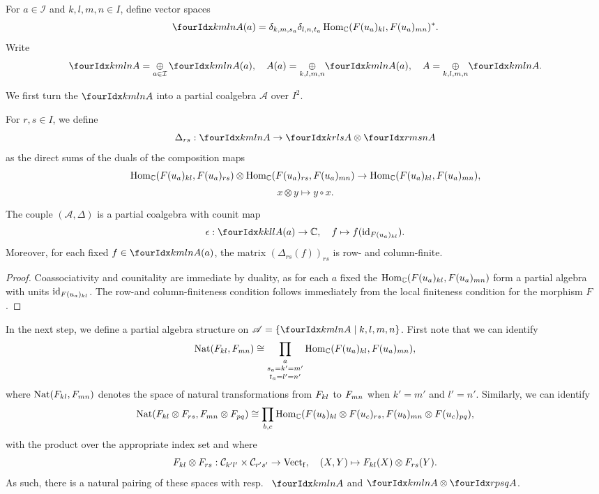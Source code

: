 \begin{Def} For $a\in \mathcal{I}$ and $k,l,m,n\in I$, define vector spaces \[\Gr{A}{k}{l}{m}{n}(a) =  \delta_{k,m,s_a}\delta_{l,n,t_a} \Hom_{\C}(\Forget(u_a)_{kl},\Forget(u_a)_{mn})^*.\] Write \[\Gr{A}{k}{l}{m}{n} =\underset{a\in \mathcal{I}}{\oplus}\, \Gr{A}{k}{l}{m}{n}(a),\quad A(a) = \underset{k,l,m,n}{\oplus} \Gr{A}{k}{l}{m}{n}(a),\quad A = \underset{k,l,m,n}{\oplus} \Gr{A}{k}{l}{m}{n}.\] 
\end{Def} 


We first turn the $\Gr{A}{k}{l}{m}{n}$ into a partial coalgebra $\mathscr{A}$ over $I^2$.

\begin{Def} For $r,s\in I$, we define \[\Delta_{rs}: \Gr{A}{k}{l}{m}{n}\rightarrow \Gr{A}{k}{l}{r}{s}\otimes \Gr{A}{r}{s}{m}{n}\] as the direct sums of the duals of the composition maps \[\operatorname{Hom}_{\mathbb{C}}(F(u_a)_{kl},F(u_a)_{rs}) \otimes \operatorname{Hom}_{\mathbb{C}}(F(u_a)_{rs},F(u_a)_{mn})\rightarrow \operatorname{Hom}_{\mathbb{C}}(F(u_a)_{kl},F(u_a)_{mn}),\]\[x\otimes y \mapsto y\circ x.\]
\end{Def} 

\begin{Lem} The couple $(\mathscr{A},\Delta)$ is a partial coalgebra with counit map \[\epsilon:\Gr{A(a)}{k}{l}{k}{l}\rightarrow \C,\quad f\mapsto f(\id_{\Forget(u_a)_{kl}}).\] Moreover, for each fixed $f\in \Gr{A(a)}{k}{l}{m}{n}$, the matrix $\left(\Delta_{rs}(f)\right)_{rs}$ is row- and column-finite.
\end{Lem} 
\begin{proof} Coassociativity and counitality are immediate by duality, as for each $a$ fixed the $\operatorname{Hom}_{\mathbb{C}}(F(u_a)_{kl},F(u_a)_{mn})$ form a partial algebra with units $\operatorname{id}_{F(u_a)_{kl}}$. The row-and column-finiteness condition follows immediately from the local finiteness condition for the morphism $F$.
\end{proof}

In the next step, we define a partial algebra structure on $\mathscr{A} = \{\Gr{A}{k}{l}{m}{n}\mid k,l,m,n\}$. First note that we can identify \[\operatorname{\mathrm{Nat}}(F_{kl},F_{mn}) \cong \underset{t_a=l'=n'}{\underset{s_a=k'=m'}{\prod_a}} \operatorname{Hom}_{\mathbb{C}}(F(u_a)_{kl},F(u_a)_{mn}),\] where $\operatorname{\mathrm{Nat}}(F_{kl},F_{mn})$ denotes the space of natural transformations from $F_{kl}$ to $F_{mn}$ when $k'=m'$ and $l'=n'$. Similarly, we can identify \[\operatorname{\mathrm{Nat}}(F_{kl}\otimes F_{rs},F_{mn}\otimes F_{pq}) \cong  \prod_{b,c} \operatorname{Hom}_{\mathbb{C}}(F(u_b)_{kl}\otimes F(u_c)_{rs} ,F(u_b)_{mn}\otimes F(u_c)_{pq}),\] with the product over the appropriate index set and where \[F_{kl}\otimes F_{rs}:\mathcal{C}_{k'l'}\times \mathcal{C}_{r's'}\rightarrow \mathrm{Vect}_{\operatorname{\mathrm{f}}},\quad (X,Y) \mapsto F_{kl}(X)\otimes F_{rs}(Y).\] As such, there is a natural pairing of these spaces with resp.~ $\Gr{A}{k}{l}{m}{n}$ and $\Gr{A}{k}{l}{m}{n}\otimes \Gr{A}{r}{s}{p}{q}$. 

